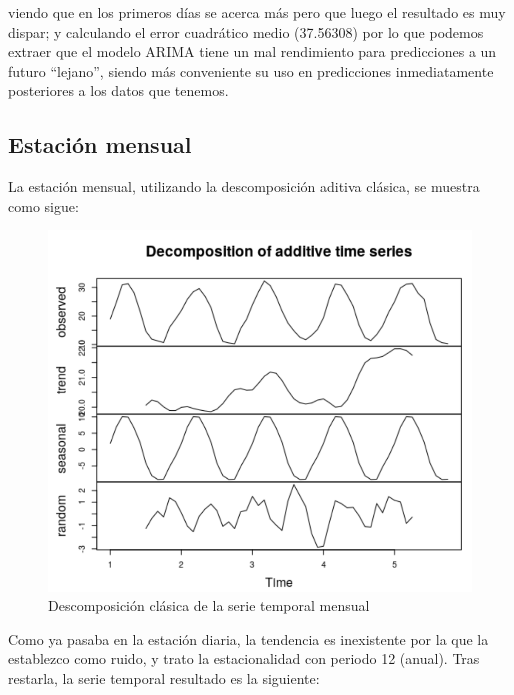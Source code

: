 viendo que en los primeros días se acerca más pero que luego el resultado es muy dispar; y calculando el error cuadrático medio (37.56308) por lo que podemos extraer que el modelo ARIMA tiene un mal rendimiento para predicciones a un futuro ``lejano'', siendo más conveniente su uso en predicciones inmediatamente posteriores a los datos que tenemos.


\subsection{Estación mensual}

La estación mensual, utilizando la descomposición aditiva clásica, se muestra como sigue:

 \begin{figure}[H] %
	\centering
	\includegraphics[scale=0.31]{decom-mensual.png}  %
	\caption{Descomposición clásica de la serie temporal mensual} 
	\label{fig:decomp-mensual}
\end{figure}


Como ya pasaba en la estación diaria, la tendencia es inexistente por la que la establezco como ruido, y trato la estacionalidad con periodo 12 (anual). Tras restarla, la serie temporal resultado es la siguiente:

